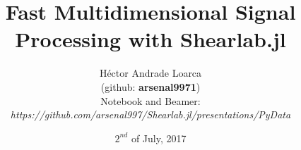 \title[Fast Multidimensional Signal Processing with Shearlab.jl]{Fast Multidimensional Signal Processing with Shearlab.jl}
\author{H\'ector Andrade Loarca\\ (github: \textbf{arsenal9971})\\ Notebook and Beamer:\\\textit{https://github.com/arsenal997/Shearlab.jl/presentations/PyData}}
\date{$2^{nd}$ of July, 2017}

\newcommand{\mylogo}{\texttt{[image: Images/bms-logo-button.png]}}

\begin{frame}[plain]
	\titlepage
\end{frame}

